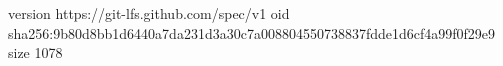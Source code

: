 version https://git-lfs.github.com/spec/v1
oid sha256:9b80d8bb1d6440a7da231d3a30c7a008804550738837fdde1d6cf4a99f0f29e9
size 1078
